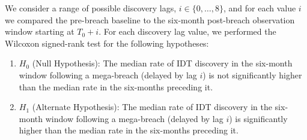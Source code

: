 We consider a range of possible discovery lags, $i \in \{0, \dots, 8\}$, and for each value $i$ we compared the pre-breach baseline to the six-month post-breach observation window starting at $T_0 + i$. For each discovery lag value, we performed the Wilcoxon signed-rank test for the following hypotheses:



\begin{enumerate}
    \item $H_0$ (Null Hypothesis): The median rate of IDT discovery in the six-month window following a mega-breach (delayed by lag $i$) is not significantly higher than the median rate in the six-months preceding it.
    \item $H_1$ (Alternate Hypothesis): The median rate of IDT discovery in the six-month window following a mega-breach (delayed by lag $i$) is significantly higher than the median rate in the six-months preceding it.
\end{enumerate}





